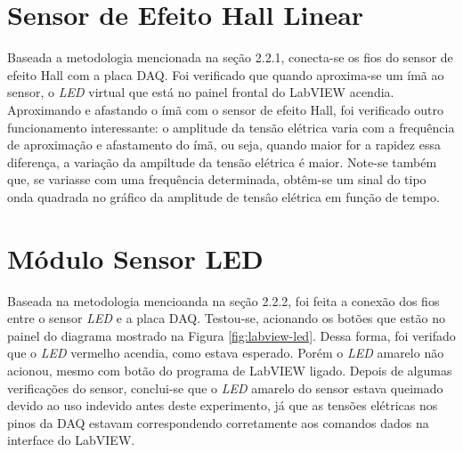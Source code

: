 \documentclass[a4paper]{instrumentacao}
\begin{document}







\section{Sensor de Efeito Hall Linear}
Baseada a metodologia mencionada na seção 2.2.1, conecta-se os fios do sensor de efeito Hall com a placa DAQ. Foi verificado que quando aproxima-se um ímã ao sensor, o \textit{LED} virtual que está no painel frontal do LabVIEW acendia. Aproximando e afastando o ímã com o sensor de efeito Hall, foi verificado outro funcionamento interessante: o amplitude da tensão elétrica varia com a frequência de aproximação e afastamento do ímã, ou seja, quando maior for a rapidez essa diferença, a variação da ampiltude
da tensão elétrica é maior. Note-se também que, se variasse com uma frequência determinada, obtêm-se um sinal do tipo onda quadrada no gráfico da amplitude de tensâo elétrica em função de tempo.

\section{Módulo Sensor LED}
Baseada na metodologia mencioanda na seção 2.2.2, foi feita a conexão dos fios  entre o sensor \textit{LED} e a placa DAQ. Testou-se, acionando os botões que estão no painel do diagrama mostrado na Figura \ref{fig:labview-led}. Dessa forma, foi verifado que o \textit{LED} vermelho acendia, como estava esperado. Porém o \textit{LED} amarelo não acionou, mesmo com botão do programa de LabVIEW ligado. Depois de algumas verificações do sensor, conclui-se que o \textit{LED} amarelo do sensor estava queimado devido ao uso indevido antes deste experimento, já que as tensões elétricas nos pinos da DAQ estavam correspondendo corretamente aos comandos dados na interface do LabVIEW.
\end{document}

